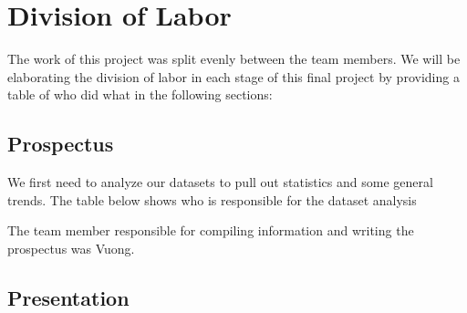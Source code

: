 \documentclass[letterpaper, 10 pt, conference]{ieeeconf}  %
\begin{document}
\section{Division of Labor}
    The work of this project was split evenly between the team members. We will be elaborating the division of labor in each stage of this final project by providing a table of who did what in the following sections:

    \subsection{Prospectus}
        We first need to analyze our datasets to pull out statistics and some general trends. The table below shows who is responsible for the dataset analysis

        \begin{table}[h!] \centering
            \caption{Datasets}
            \begin{threeparttable}
            \end{threeparttable}
        \end{table}
    
        The team member responsible for compiling information and writing the prospectus was Vuong.

    \subsection{Presentation}
\end{document}
